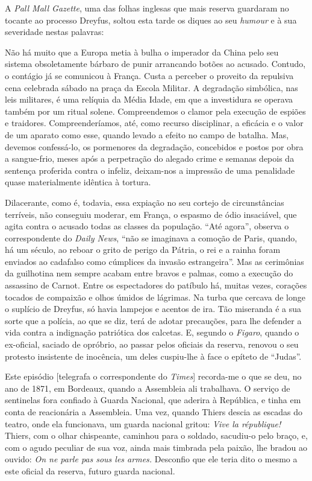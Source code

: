 A \textit{Pall Mall Gazette}, uma das folhas inglesas que mais reserva guardaram
no tocante ao processo Dreyfus, soltou esta tarde os diques ao seu
\textit{humour} e à sua severidade nestas palavras:

\begin{hedraquote}
Não há muito que a Europa metia à bulha o imperador da China pelo seu
sistema obsoletamente bárbaro de punir arrancando botões ao acusado.
Contudo, o contágio já se comunicou à França. Custa a
perceber o proveito da repulsiva cena celebrada sábado na praça da
Escola Militar. A degradação simbólica, nas leis militares, é uma
relíquia da Média Idade, em que a investidura se operava também por
um ritual solene. Compreendemos o clamor pela execução de espiões e
traidores. Compreenderíamos, até, como recurso disciplinar, a eficácia
e o valor de um aparato como esse, quando levado a efeito no campo de
batalha. Mas, devemos confessá-lo, os pormenores da degradação,
concebidos e postos por obra a sangue-frio, meses após a perpetração
do alegado crime e semanas depois da sentença proferida contra o
infeliz, deixam-nos a impressão de uma penalidade quase materialmente
idêntica à tortura.
\end{hedraquote}

Dilacerante, como é, todavia, essa expiação no seu cortejo de
circunstâncias terríveis, não conseguiu moderar, em França, o espasmo
de ódio insaciável, que agita contra o acusado todas as classes da
população. ``Até agora'', observa o correspondente do 
\textit{Daily News}, ``não se imaginava a comoção
de Paris, quando, há um século, ao reboar o grito de perigo da Pátria,
o rei e a rainha foram enviados ao cadafalso como cúmplices da invasão
estrangeira''. Mas as cerimônias da guilhotina nem sempre
acabam entre bravos e palmas, como a execução do assassino de Carnot.
Entre os espectadores do patíbulo há, muitas vezes, corações tocados de
compaixão e olhos úmidos de lágrimas. Na turba que cercava de longe o
suplício de Dreyfus, só havia lampejos e acentos de ira. Tão miseranda é
a sua sorte que a polícia, ao que se diz, terá de adotar precauções,
para lhe defender a vida contra a indignação patriótica dos
calcetas. E, segundo o \textit{Figaro}, quando o ex-oficial, saciado de
opróbrio, ao passar pelos oficiais da reserva, renovou o seu protesto
insistente de inocência, um deles cuspiu-lhe à face o epíteto de
``Judas''.

\begin{hedraquote}
Este episódio [telegrafa o correspondente do \textit{Times}] recorda-me o que
se deu, no ano de 1871, em Bordeaux, quando a Assembleia ali
trabalhava. O serviço de sentinelas fora confiado à Guarda Nacional,
que aderira à República, e tinha em conta de reacionária a Assembleia.
Uma vez, quando Thiers descia as escadas do teatro, onde ela
funcionava, um guarda nacional gritou: \textit{Vive la république!} Thiers, com
o olhar chispeante, caminhou para o soldado, sacudiu-o pelo braço, e,
com o agudo peculiar de sua voz, ainda mais timbrada pela paixão, lhe
bradou ao ouvido: \textit{On ne parle pas sous les armes.}
Desconfio que ele teria dito o mesmo a este oficial da reserva, futuro guarda nacional.
\end{hedraquote}

